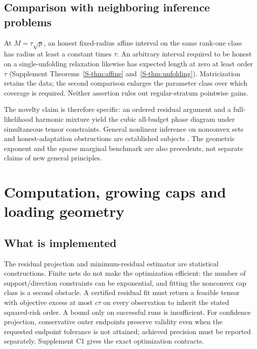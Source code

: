 \documentclass[11pt]{article}
\begin{document}
\subsection{Comparison with neighboring inference problems}
At $M=\tau\sqrt p$, an honest fixed-radius affine interval on the same rank-one class has radius at least a constant times $\tau$. An arbitrary interval required to be honest on a single-unfolding relaxation likewise has expected length at zero at least order $\tau$ (Supplement Theorems~\ref{S-thm:affine} and~\ref{S-thm:unfolding}). Matricization retains the data; the second comparison enlarges the parameter class over which coverage is required. Neither assertion rules out regular-stratum pointwise gains.

The novelty claim is therefore specific: an ordered residual argument and a full-likelihood harmonic mixture yield the cubic all-budget phase diagram under simultaneous tensor constraints. General nonlinear inference on nonconvex sets and honest-adaptation obstructions are established subjects \citep{cailownonconvex2004,cailow2004,juditskynemirovski2020}. The geometric exponent and the sparse marginal benchmark are also precedents, not separate claims of new general principles.

\section{Computation, growing caps and loading geometry}\label{sec:scope}
\subsection{What is implemented}
The residual projection and minimum-residual estimator are statistical constructions. Finite nets do not make the optimization efficient: the number of support/direction constraints can be exponential, and fitting the nonconvex cap class is a second obstacle. A certified residual fit must return a feasible tensor with objective excess at most $c\tau$ on every observation to inherit the stated squared-risk order. A bound only on successful runs is insufficient. For confidence projection, conservative outer endpoints preserve validity even when the requested endpoint tolerance is not attained; achieved precision must be reported separately. Supplement C1 gives the exact optimization contracts.
\end{document}
